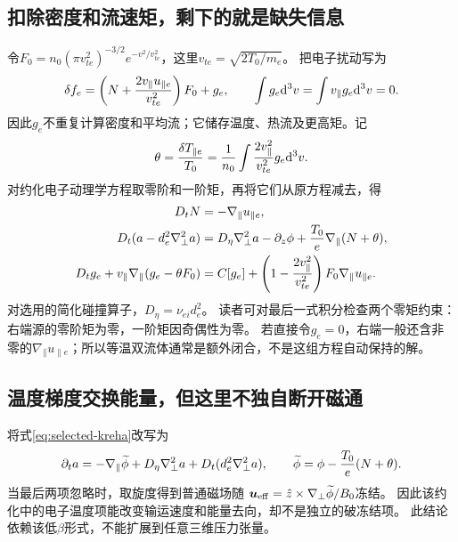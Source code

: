 \subsection{扣除密度和流速矩，剩下的就是缺失信息}
令$F_0=n_0(\pi v_{te}^2)^{-3/2}e^{-v^2/v_{te}^2}$，这里$v_{te}=\sqrt{2T_0/m_e}$。
把电子扰动写为
\begin{equation}
 \delta f_e=\left(N+{2v_\parallel u_{\parallel e}\over v_{te}^2}\right)F_0+g_e,
 \qquad\int g_e\mathrm d^3v=\int v_\parallel g_e\mathrm d^3v=0.
\end{equation}
因此$g_e$不重复计算密度和平均流；它储存温度、热流及更高矩。记
\begin{equation}
 \theta={\delta T_{\parallel e}\over T_0}
 ={1\over n_0}\int{2v_\parallel^2\over v_{te}^2}g_e\mathrm d^3v.
\end{equation}
对约化电子动理学方程取零阶和一阶矩，再将它们从原方程减去，得
\begin{align}
 D_tN&=-\nabla_\parallel u_{\parallel e},\label{eq:selected-krehn}\\
 D_t(a-d_e^2\nabla_\perp^2a)&=D_\eta\nabla_\perp^2a-\partial_z\phi
 +{T_0\over e}\nabla_\parallel(N+\theta),\label{eq:selected-kreha}\\
 D_tg_e+v_\parallel\nabla_\parallel(g_e-\theta F_0)
 &=C[g_e]+\left(1-{2v_\parallel^2\over v_{te}^2}\right)
 F_0\nabla_\parallel u_{\parallel e}.\label{eq:selected-krehg}
\end{align}
对选用的简化碰撞算子，$D_\eta=\nu_{ei}d_e^2$。
读者可对最后一式积分检查两个零矩约束：右端源的零阶矩为零，一阶矩因奇偶性为零。
若直接令$g_e=0$，右端一般还含非零的$\nabla_\parallel u_{\parallel e}$；所以等温双流体通常是额外闭合，不是这组方程自动保持的解。

\subsection{温度梯度交换能量，但这里不独自断开磁通}
将式\eqref{eq:selected-kreha}改写为
\begin{equation}
 \partial_ta=-\nabla_\parallel\widetilde\phi
 +D_\eta\nabla_\perp^2a+D_t(d_e^2\nabla_\perp^2a),\qquad
 \widetilde\phi=\phi-{T_0\over e}(N+\theta).
\end{equation}
当最后两项忽略时，取旋度得到普通磁场随
$\bm{u}_{\rm eff}=\hat z\times\nabla_\perp\widetilde\phi/B_0$冻结。
因此该约化中的电子温度项能改变输运速度和能量去向，却不是独立的破冻结项。
此结论依赖该低$\beta$形式，不能扩展到任意三维压力张量。

